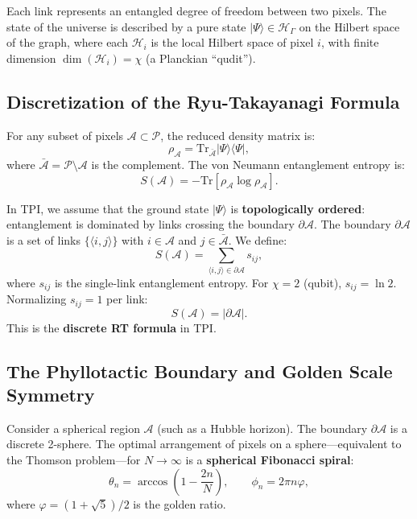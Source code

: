 \documentclass[11pt,a4paper]{article}
\theoremstyle{definition}
\begin{document}
Each link represents an entangled degree of freedom between two pixels. The state of the universe is described by a pure state $|\Psi\rangle \in \mathcal{H}_\Gamma$ on the Hilbert space of the graph, where each $\mathcal{H}_i$ is the local Hilbert space of pixel $i$, with finite dimension $\dim(\mathcal{H}_i) = \chi$ (a Planckian ``qudit'').

\subsection{Discretization of the Ryu-Takayanagi Formula}

For any subset of pixels $\mathcal{A} \subset \mathcal{P}$, the reduced density matrix is:
\begin{equation}
\rho_{\mathcal{A}} = \mathrm{Tr}_{\bar{\mathcal{A}}} |\Psi\rangle\langle\Psi|,
\end{equation}
where $\bar{\mathcal{A}} = \mathcal{P} \setminus \mathcal{A}$ is the complement. The von Neumann entanglement entropy is:
\begin{equation}
S(\mathcal{A}) = -\mathrm{Tr}[\rho_{\mathcal{A}} \log \rho_{\mathcal{A}}].
\end{equation}

In TPI, we assume that the ground state $|\Psi\rangle$ is \textbf{topologically ordered}: entanglement is dominated by links crossing the boundary $\partial\mathcal{A}$. The boundary $\partial\mathcal{A}$ is a set of links $\{\langle i,j \rangle\}$ with $i \in \mathcal{A}$ and $j \in \bar{\mathcal{A}}$. We define:
\begin{equation}\label{eq:RT_discrete}
S(\mathcal{A}) = \sum_{\langle i,j \rangle \in \partial\mathcal{A}} s_{ij},
\end{equation}
where $s_{ij}$ is the single-link entanglement entropy. For $\chi = 2$ (qubit), $s_{ij} = \ln 2$. Normalizing $s_{ij} = 1$ per link:
\begin{equation}
S(\mathcal{A}) = |\partial\mathcal{A}|.
\end{equation}
This is the \textbf{discrete RT formula} in TPI.

\subsection{The Phyllotactic Boundary and Golden Scale Symmetry}\label{subsec:boundary}

Consider a spherical region $\mathcal{A}$ (such as a Hubble horizon). The boundary $\partial\mathcal{A}$ is a discrete 2-sphere. The optimal arrangement of pixels on a sphere---equivalent to the Thomson problem---for $N \to \infty$ is a \textbf{spherical Fibonacci spiral}:
\begin{equation}
\theta_n = \arccos\left(1 - \frac{2n}{N}\right), \qquad \phi_n = 2\pi n \varphi,
\end{equation}
where $\varphi = (1+\sqrt{5})/2$ is the golden ratio.
\end{document}
